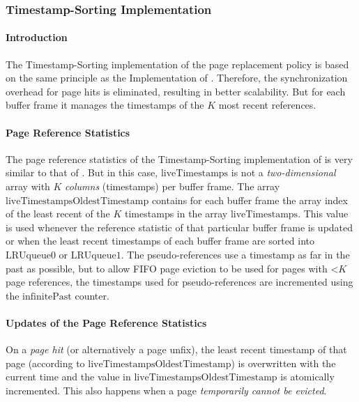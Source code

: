 \subsubsection[Timestamp-Sorting]{Timestamp-Sorting Implementation} \label{subsubsec:lru-k_timestamp}

\paragraph{Introduction}

    The Timestamp-Sorting implementation of the  page replacement policy is based on the same principle as the  Implementation of . Therefore, the synchronization overhead for page hits is eliminated, resulting in better scalability. But for each buffer frame it manages the timestamps of the $K$ most recent references.

\paragraph{Page Reference Statistics}

    The page reference statistics of the Time\-stamp-Sort\-ing implementation of  is very similar to that of . But in this case, $\text{liveTimestamps}$ is not a \emph{two-dimensional} array with $K$ \emph{columns} (timestamps) per buffer frame. The array $\text{liveTimestampsOldestTimestamp}$ contains for each buffer frame the array index of the least recent of the $K$ timestamps in the array $\text{liveTimestamps}$. This value is used whenever the reference statistic of that particular buffer frame is updated or when the least recent timestamps of each buffer frame are sorted into $\text{LRUqueue0}$ or $\text{LRUqueue1}$. The pseudo-references use a timestamp as far in the past as possible, but to allow FIFO page eviction to be used for pages with $\mathord{<} K$ page references, the timestamps used for pseudo-references are incremented using the $\text{infinitePast}$ counter.

\paragraph{Updates of the Page Reference Statistics}

    On a \emph{page hit} (or alternatively a page unfix), the least recent timestamp of that page (according to $\text{liveTimestampsOldestTimestamp}$) is overwritten with the current time and the value in $\text{liveTimestampsOldestTimestamp}$ is atomically incremented. This also happens when a page \emph{temporarily cannot be evicted}.

